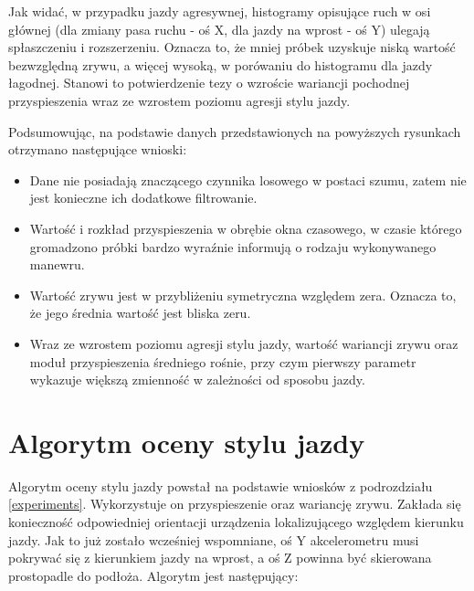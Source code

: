 Jak widać, w przypadku jazdy agresywnej, histogramy opisujące ruch w osi głównej (dla zmiany pasa ruchu - oś X, dla jazdy na wprost - oś Y) ulegają spłaszczeniu i rozszerzeniu. Oznacza to, że mniej próbek uzyskuje niską wartość bezwzględną zrywu, a więcej wysoką, w porówaniu do histogramu dla jazdy łagodnej. Stanowi to potwierdzenie tezy o wzroście wariancji pochodnej przyspieszenia wraz ze wzrostem poziomu agresji stylu jazdy.

\pagebreak
Podsumowując, na podstawie danych przedstawionych na powyższych rysunkach otrzymano następujące wnioski:

\begin{itemize}
\item Dane nie posiadają znaczącego czynnika losowego w postaci szumu, zatem nie jest konieczne ich dodatkowe filtrowanie.
\item Wartość i rozkład przyspieszenia w obrębie okna czasowego, w czasie którego gromadzono próbki bardzo wyraźnie informują o rodzaju wykonywanego manewru.
\item Wartość zrywu jest w przybliżeniu symetryczna względem zera. Oznacza to, że jego średnia wartość jest bliska zeru.
\item Wraz ze wzrostem poziomu agresji stylu jazdy, wartość wariancji zrywu oraz moduł przyspieszenia średniego rośnie, przy czym pierwszy parametr wykazuje większą zmienność w zależności od sposobu jazdy. 
\end{itemize}

\section{Algorytm oceny stylu jazdy}

Algorytm oceny stylu jazdy powstał na podstawie wniosków z podrozdziału \ref{experiments}. Wykorzystuje on przyspieszenie oraz wariancję zrywu. Zakłada się konieczność odpowiedniej orientacji urządzenia lokalizującego względem kierunku jazdy. Jak to już zostało wcześniej wspomniane, oś Y akcelerometru musi pokrywać się z kierunkiem jazdy na wprost, a oś Z powinna być skierowana prostopadle do podłoża. Algorytm jest następujący:

